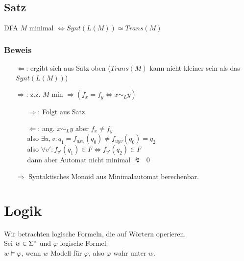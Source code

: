     \subsection{Satz}
        DFA $M$ minimal $\Leftrightarrow Synt(L(M))\simeq Trans(M)$
        \subsubsection{Beweis}
            \begin{itemize}
                \item[$\Leftarrow$:] ergibt sich aus Satz oben ($Trans(M)$ kann nicht kleiner sein als das $Synt(L(M))$)
                \item[$\Rightarrow$:] z.z. $M$ min $\Rightarrow (f_x=f_y\Leftrightarrow x\sim_L y)$
                \begin{itemize}
                    \item[$\Rightarrow$:] Folgt aus Satz
                    \item[$\Leftarrow$:] ang. $x\sim_L y$ aber $f_x\not=f_y$\\
                    also $\exists u,v: q_1=f_{uxv}(q_0)\not=f_{uyv}(q_0)=q_2$\\
                    also $\forall v': f_{v'}(q_1)\in F\Leftrightarrow f_{v'}(q_2)\in F$\\
                    dann aber Automat nicht minimal $\lightning$ \qed
                \end{itemize}
                $\Rightarrow$ Syntaktisches Monoid aus Minimalautomat berechenbar.
            \end{itemize}
\section{Logik}
    Wir betrachten logische Formeln, die auf Wörtern operieren.\\
    Sei $w\in\Sigma^*$ und $\varphi$ logische Formel:\\
    $w\models \varphi$, wenn $w$ Modell für $\varphi$, also $\varphi$ wahr unter $w$.
